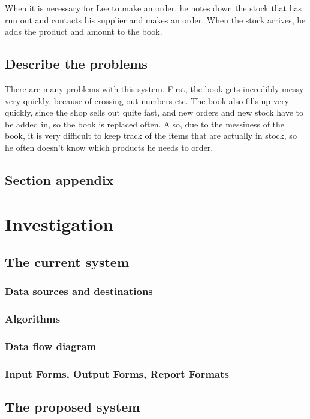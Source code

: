 When it is necessary for Lee to make an order, he notes down the stock that has run out and contacts his supplier and makes an order. When the stock arrives, he adds the product and amount to the book.
\subsection{Describe the problems}
There are many problems with this system. First, the book gets incredibly messy very quickly, because of crossing out numbers etc. The book also fills up very quickly, since the shop sells out quite fast, and new orders and new stock have to be added in, so the book is replaced often. Also, due to the messiness of the book, it is very difficult to keep track of the items that are actually in stock, so he often doesn't know which products he needs to order. 
\subsection{Section appendix}

\section{Investigation}

\subsection{The current system}

\subsubsection{Data sources and destinations}

\subsubsection{Algorithms}

\subsubsection{Data flow diagram}

\subsubsection{Input Forms, Output Forms, Report Formats}

\subsection{The proposed system}

